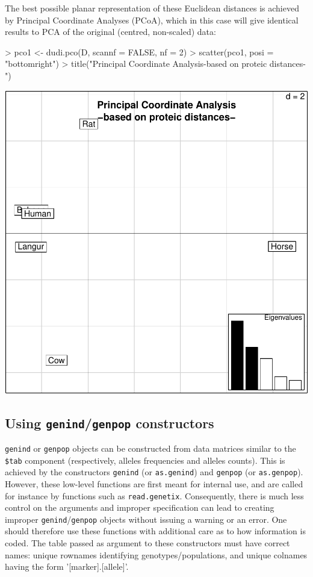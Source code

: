 \documentclass{article}
\begin{document}
The best possible planar representation of these Euclidean distances is achieved by Principal
Coordinate Analyses (PCoA), which in this case will give identical results to PCA of the original
(centred, non-scaled) data:
\begin{Schunk}
\begin{Sinput}
> pco1 <- dudi.pco(D, scannf = FALSE, nf = 2)
> scatter(pco1, posi = "bottomright")
> title("Principal Coordinate Analysis\n-based on proteic distances-")
\end{Sinput}
\end{Schunk}
\includegraphics{figs/base-045}




\subsection{Using \texttt{genind}/\texttt{genpop} constructors}
\texttt{genind} or \texttt{genpop} objects can be constructed from data matrices similar to the \texttt{\$tab} component (respectively, alleles frequencies and alleles counts).
This is achieved by the constructors \texttt{genind} (or \texttt{as.genind})  and \texttt{genpop}
(or \texttt{as.genpop}).
However, these low-level functions are first meant for internal use, and are called for instance by
functions such as \texttt{read.genetix}.
Consequently, there is much less control on the arguments and improper specification can lead to
creating improper \texttt{genind}/\texttt{genpop} objects without issuing a warning or an error.
One should therefore use these functions with additional care as to how information is coded.
The table passed as argument to these constructors must have correct
names: unique rownames identifying genotypes/populations, and unique colnames
having the form '[marker].[allele]'.
\end{document}

